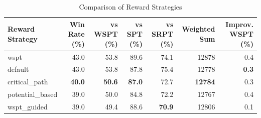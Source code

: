 \begin{table}[htbp]%
\centering%
\begin{tabular}{lrrrrrr}%
\toprule%
\textbf{Reward Strategy}&\textbf{Win Rate (\%)}&\textbf{vs WSPT (\%)}&\textbf{vs SPT (\%)}&\textbf{vs SRPT (\%)}&\textbf{Weighted Sum}&\textbf{Improv. WSPT (\%)}\\%
\midrule%
wspt&43.0&53.8&89.6&74.1&12878&-0.4\\%
default&43.0&53.8&87.8&75.4&12778&\textbf{0.3}\\%
critical_path&\textbf{40.0}&\textbf{50.6}&\textbf{87.0}&72.7&\textbf{12784}&0.3\\%
potential_based&39.0&50.0&84.8&72.2&12767&0.4\\%
wspt_guided&39.0&49.4&88.6&\textbf{70.9}&12806&0.1\\%
\bottomrule%
\end{tabular}%
\caption{Comparison of Reward Strategies}%
\label{tab:rewards}%
\end{table}